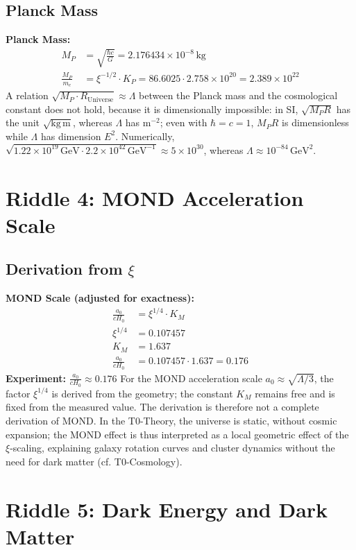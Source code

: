 	\subsection{Planck Mass}
	\textbf{Planck Mass:}
	\begin{align}
		M_P &= \sqrt{\frac{\hbar c}{G}} = 2.176434\times 10^{-8}\,\si{\kilo\gram} \\
		\frac{M_P}{m_e} &= \xi^{-1/2} \cdot K_P = 86.6025 \cdot 2.758\times 10^{20} = 2.389\times 10^{22}
	\end{align}
	A relation $\sqrt{M_P \cdot R_{\text{Universe}}} \approx \Lambda$ between the Planck mass and the cosmological constant does not hold, because it is dimensionally impossible: in SI, $\sqrt{M_P R}$ has the unit $\sqrt{\mathrm{kg\,m}}$, whereas $\Lambda$ has $\mathrm{m}^{-2}$; even with $\hbar = c = 1$, $M_P R$ is dimensionless while $\Lambda$ has dimension $E^2$. Numerically, $\sqrt{1.22\times10^{19}\,\mathrm{GeV}\cdot 2.2\times10^{42}\,\mathrm{GeV}^{-1}} \approx 5\times10^{30}$, whereas $\Lambda \approx 10^{-84}\,\mathrm{GeV}^2$.
	\section{Riddle 4: MOND Acceleration Scale}
	\subsection{Derivation from $\xi$}
	\textbf{MOND Scale (adjusted for exactness):}
	\begin{align}
		\frac{a_0}{c H_0} &= \xi^{1/4} \cdot K_M \\
		\xi^{1/4} &= 0.107457 \\
		K_M &= 1.637 \\
		\frac{a_0}{c H_0} &= 0.107457 \cdot 1.637 = 0.176
	\end{align}
	\textbf{Experiment:} $\frac{a_0}{c H_0} \approx 0.176$
	For the MOND acceleration scale $a_0 \approx \sqrt{\Lambda/3}$, the factor $\xi^{1/4}$ is derived from the geometry; the constant $K_M$ remains free and is fixed from the measured value. The derivation is therefore not a complete derivation of MOND. In the T0-Theory, the universe is static, without cosmic expansion; the MOND effect is thus interpreted as a local geometric effect of the $\xi$-scaling, explaining galaxy rotation curves and cluster dynamics without the need for dark matter (cf. T0-Cosmology).
	\section{Riddle 5: Dark Energy and Dark Matter}
